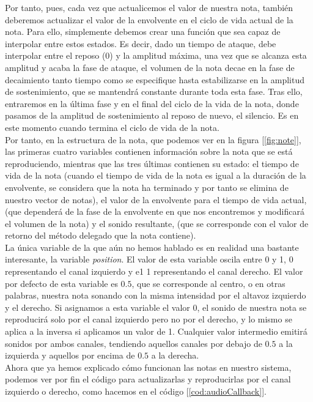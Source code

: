 Por tanto, pues, cada vez que actualicemos el valor de nuestra nota, también deberemos actualizar el valor de la envolvente en el ciclo de vida actual de la nota. Para ello, simplemente debemos crear una función que sea capaz de interpolar entre estos estados. Es decir, dado un tiempo de ataque, debe interpolar entre el reposo (0) y la amplitud máxima, una vez que se alcanza esta amplitud y acaba la fase de ataque, el volumen de la nota decae en la fase de decaimiento tanto tiempo como se especifique hasta estabilizarse en la amplitud de sostenimiento, que se mantendrá constante durante toda esta fase. Tras ello, entraremos en la última fase y en el final del ciclo de la vida de la nota, donde pasamos de la amplitud de sostenimiento al reposo de nuevo, el silencio. Es en este momento cuando termina el ciclo de vida de la nota.\\

Por tanto, en la estructura de la nota, que podemos ver en la figura [\ref{fig:note}], las primeras cuatro variables contienen información sobre la nota que se está reproduciendo, mientras que las tres últimas contienen su estado: el tiempo de vida de la nota (cuando el tiempo de vida de la nota es igual a la duración de la envolvente, se considera que la nota ha terminado y por tanto se elimina de nuestro vector de notas), el valor de la envolvente para el tiempo de vida actual, (que dependerá de la fase de la envolvente en que nos encontremos y modificará el volumen de la nota) y el sonido resultante, (que se corresponde con el valor de retorno del método delegado que la nota contiene).\\

La única variable de la que aún no hemos hablado es en realidad una bastante interesante, la variable \emph{position}. El valor de esta variable oscila entre 0 y 1, 0 representando el canal izquierdo y e1 1 representando el canal derecho. El valor por defecto de esta variable es \(0.5\), que se corresponde al centro, o en otras palabras, nuestra nota sonando con la misma intensidad por el altavoz izquierdo y el derecho. Si asignamos a esta variable el valor 0, el sonido de nuestra nota se reproducirá solo por el canal izquierdo pero no por el derecho, y lo mismo se aplica a la inversa si aplicamos un valor de 1. Cualquier valor intermedio emitirá sonidos por ambos canales, tendiendo aquellos canales por debajo de \(0.5\) a la izquierda y aquellos por encima de \(0.5\) a la derecha.\\

Ahora que ya hemos explicado cómo funcionan las notas en nuestro sistema, podemos ver por fin el código para actualizarlas y reproducirlas por el canal izquierdo o derecho, como hacemos en el código [\ref{cod:audioCallback}].\\

